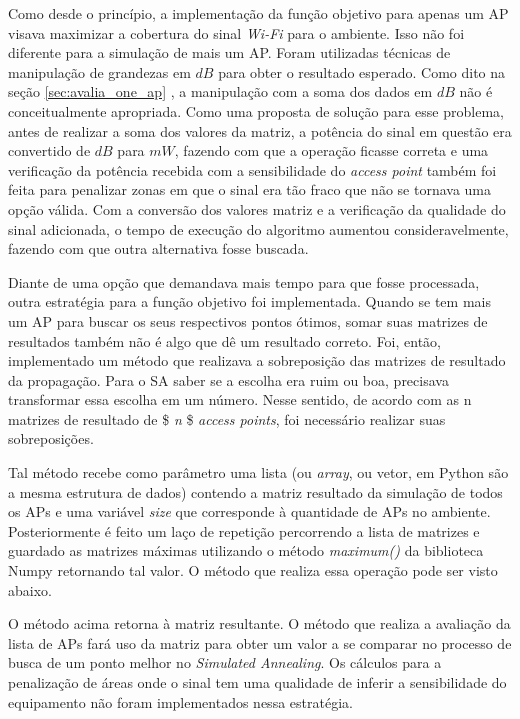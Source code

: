 \documentclass[
	12pt,				%
	twoside,			%
	a4paper,			%
	english,			%
	french,				%
	spanish,			%
	brazil				%
	]{abntex2}
\begin{document}
Como desde o princípio, a implementação da função objetivo para apenas
um AP visava maximizar a cobertura do sinal \emph{Wi-Fi} para o
ambiente. Isso não foi diferente para a simulação de mais um AP. Foram
utilizadas técnicas de manipulação de grandezas em \(dB\) para obter o
resultado esperado. Como dito na seção \ref{sec:avalia_one_ap} , a
manipulação com a soma dos dados em \(dB\) não é conceitualmente
apropriada. Como uma proposta de solução para esse problema, antes de
realizar a soma dos valores da matriz, a potência do sinal em questão
era convertido de \(dB\) para \(mW\), fazendo com que a operação ficasse
correta e uma verificação da potência recebida com a sensibilidade do
\emph{access point} também foi feita para penalizar zonas em que o sinal
era tão fraco que não se tornava uma opção válida. Com a conversão dos
valores matriz e a verificação da qualidade do sinal adicionada, o tempo
de execução do algoritmo aumentou consideravelmente, fazendo com que
outra alternativa fosse buscada.

Diante de uma opção que demandava mais tempo para que fosse processada,
outra estratégia para a função objetivo foi implementada. Quando se tem
mais um AP para buscar os seus respectivos pontos ótimos, somar suas
matrizes de resultados também não é algo que dê um resultado correto.
Foi, então, implementado um método que realizava a sobreposição das
matrizes de resultado da propagação. Para o SA saber se a escolha era
ruim ou boa, precisava transformar essa escolha em um número. Nesse
sentido, de acordo com as n matrizes de resultado de \$ \textit{n} \$
\emph{access points}, foi necessário realizar suas sobreposições.

Tal método recebe como parâmetro uma lista (ou \emph{array}, ou vetor,
em Python são a mesma estrutura de dados) contendo a matriz resultado da
simulação de todos os APs e uma variável \emph{size} que corresponde à
quantidade de APs no ambiente. Posteriormente é feito um laço de
repetição percorrendo a lista de matrizes e guardado as matrizes máximas
utilizando o método \emph{maximum()} da biblioteca Numpy retornando tal
valor. O método que realiza essa operação pode ser visto abaixo.



O método acima retorna à matriz resultante. O método que realiza a
avaliação da lista de APs fará uso da matriz para obter um valor a se
comparar no processo de busca de um ponto melhor no \emph{Simulated
Annealing}. Os cálculos para a penalização de áreas onde o sinal tem uma
qualidade de inferir a sensibilidade do equipamento não foram
implementados nessa estratégia.
\end{document}
